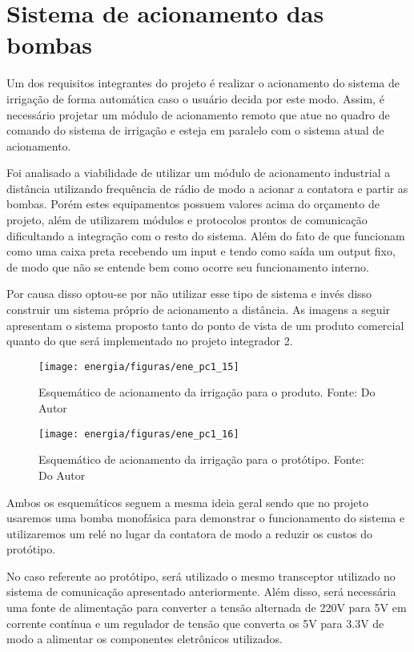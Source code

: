 \section{Sistema de acionamento das bombas} 

Um dos requisitos integrantes do projeto é realizar o acionamento do sistema de irrigação de forma automática caso o usuário decida por este modo. Assim, é necessário projetar um módulo de acionamento remoto que atue no quadro de comando do sistema de irrigação e esteja em paralelo com o sistema atual de acionamento.

Foi analisado a viabilidade de utilizar um módulo de acionamento industrial a distância utilizando frequência de rádio de modo a acionar a contatora e partir as bombas. Porém estes equipamentos possuem valores acima do orçamento de projeto, além de utilizarem módulos e protocolos prontos de comunicação dificultando a integração com o resto do sistema. Além do fato de que funcionam como uma caixa preta recebendo um input e tendo como saída um output fixo, de modo que não se entende bem como ocorre seu funcionamento interno.

Por causa disso optou-se por não utilizar esse tipo de sistema e invés disso construir um sistema próprio de acionamento a distância. As imagens a seguir apresentam o sistema proposto tanto do ponto de vista de um produto comercial quanto do que será implementado no projeto integrador 2.

	\begin{figure}[H]
		\centering
		\texttt{[image: energia/figuras/ene\_pc1\_15]}
		\caption{Esquemático de acionamento da irrigação para o produto. Fonte: Do Autor}
		\label{ene_pc1_15}
	\end{figure}


	\begin{figure}[H]
		\centering
		\texttt{[image: energia/figuras/ene\_pc1\_16]}
		\caption{Esquemático de acionamento da irrigação para o protótipo. Fonte: Do Autor}
		\label{ene_pc1_16}
	\end{figure}


Ambos os esquemáticos seguem a mesma ideia geral sendo que no projeto usaremos uma bomba monofásica para demonstrar o funcionamento do sistema e utilizaremos um relé no lugar da contatora de modo a reduzir os custos do protótipo.

No caso referente ao protótipo, será utilizado o mesmo transceptor utilizado no sistema de comunicação apresentado anteriormente. Além disso, será necessária uma fonte de alimentação para converter a tensão alternada de 220V para 5V em corrente contínua e um regulador de tensão que converta os 5V para 3.3V de modo a alimentar os componentes eletrônicos utilizados.


